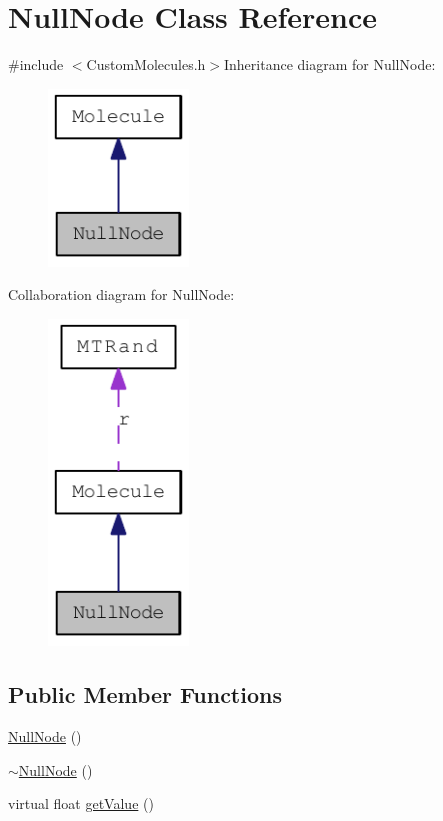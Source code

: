 \hypertarget{classNullNode}{
\section{NullNode Class Reference}
\label{classNullNode}
}


{\ttfamily \#include $<$CustomMolecules.h$>$}Inheritance diagram for NullNode:\nopagebreak
\begin{figure}[H]
\begin{center}
\leavevmode
\includegraphics[width=106pt]{classNullNode__inherit__graph}
\end{center}
\end{figure}
Collaboration diagram for NullNode:\nopagebreak
\begin{figure}[H]
\begin{center}
\leavevmode
\includegraphics[width=106pt]{classNullNode__coll__graph}
\end{center}
\end{figure}
\subsection*{Public Member Functions}
\begin{DoxyCompactItemize}
\item 
\hyperlink{classNullNode_ac6fefccfedcc2be3ac11cf4f33a6c113}{NullNode} ()
\item 
\hyperlink{classNullNode_ab7852d5e1b9665bb765fd3f10d33ce0b}{$\sim$NullNode} ()
\item 
virtual float \hyperlink{classNullNode_ae1cddbf915028ab4f2aebf6879c6a682}{getValue} ()
\end{DoxyCompactItemize}


